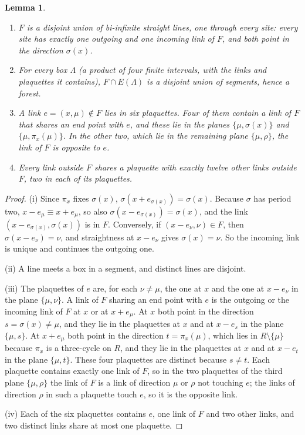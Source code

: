 \documentclass[11pt]{amsart}
\newtheorem{lemma}[theorem]{Lemma}
\theoremstyle{definition}
\theoremstyle{remark}
\numberwithin{equation}{section}
\begin{document}
\begin{lemma}\label{lem:structure}
\begin{enumerate}[label=\textup{(\roman*)},leftmargin=*]
\item $F$ is a disjoint union of bi-infinite straight lines, one through
every site: every site has exactly one outgoing and one incoming link of $F$,
and both point in the direction $\sigma(x)$.
\item For every box $\Lambda$ (a product of four finite intervals, with the
links and plaquettes it contains), $F\cap E(\Lambda)$ is a disjoint union of
segments, hence a forest.
\item A link $e=(x,\mu)\notin F$ lies in six plaquettes. Four of them contain
a link of $F$ that shares an end point with $e$, and these lie in the planes
$\{\mu,\sigma(x)\}$ and $\{\mu,\pi_x(\mu)\}$. In the other two, which lie in
the remaining plane $\{\mu,\rho\}$, the link of $F$ is opposite to $e$.
\item Every link outside $F$ shares a plaquette with exactly twelve other
links outside $F$, two in each of its plaquettes.
\end{enumerate}
\end{lemma}

\begin{proof}
(i) Since $\pi_x$ fixes $\sigma(x)$, $\sigma(x+e_{\sigma(x)})=\sigma(x)$.
Because $\sigma$ has period two, $x-e_\mu\equiv x+e_\mu$, so also
$\sigma(x-e_{\sigma(x)})=\sigma(x)$, and the link $(x-e_{\sigma(x)},\sigma(x))$ is
in $F$. Conversely, if $(x-e_\nu,\nu)\in F$, then $\sigma(x-e_\nu)=\nu$, and
straightness at $x-e_\nu$ gives $\sigma(x)=\nu$. So the incoming link is unique
and continues the outgoing one.

(ii) A line meets a box in a segment, and distinct lines are disjoint.

(iii) The plaquettes of $e$ are, for each $\nu\ne\mu$, the one at $x$ and the
one at $x-e_\nu$ in the plane $\{\mu,\nu\}$. A link of $F$ sharing an end point
with $e$ is the outgoing or the incoming link of $F$ at $x$ or at $x+e_\mu$.
At $x$ both point in the direction $s=\sigma(x)\ne\mu$, and they lie in the
plaquettes at $x$ and at $x-e_s$ in the plane $\{\mu,s\}$. At $x+e_\mu$ both
point in the direction $t=\pi_x(\mu)$, which lies in $R\setminus\{\mu\}$ because
$\pi_x$ is a three-cycle on $R$, and they lie in the plaquettes at $x$ and at
$x-e_t$ in the plane $\{\mu,t\}$. These four plaquettes are distinct because
$s\ne t$. Each plaquette contains exactly one link of $F$, so in the two
plaquettes of the third plane $\{\mu,\rho\}$ the link of $F$ is a link of
direction $\mu$ or $\rho$ not touching $e$; the links of direction $\rho$ in
such a plaquette touch $e$, so it is the opposite link.

(iv) Each of the six plaquettes contains $e$, one link of $F$ and two other
links, and two distinct links share at most one plaquette.
\end{proof}
\end{document}
